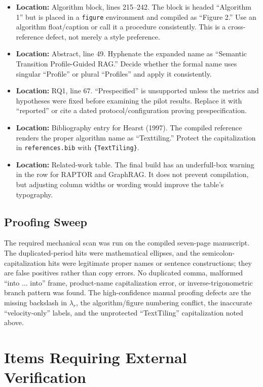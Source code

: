 \documentclass[11pt]{article}
\newcommand{\location}[1]{\textbf{Location:} #1}
\begin{document}
\begin{itemize}
  \item \location{Algorithm block, lines 215--242.} The block is headed ``Algorithm 1'' but is placed in a \texttt{figure} environment and compiled as ``Figure 2.'' Use an algorithm float/caption or call it a procedure consistently. This is a cross-reference defect, not merely a style preference.
  \item \location{Abstract, line 49.} Hyphenate the expanded name as ``Semantic Transition Profile-Guided RAG.'' Decide whether the formal name uses singular ``Profile'' or plural ``Profiles'' and apply it consistently.
  \item \location{RQ1, line 67.} ``Prespecified'' is unsupported unless the metrics and hypotheses were fixed before examining the pilot results. Replace it with ``reported'' or cite a dated protocol/configuration proving prespecification.
  \item \location{Bibliography entry for Hearst (1997).} The compiled reference renders the proper algorithm name as ``Texttiling.'' Protect the capitalization in \texttt{references.bib} with \verb|{TextTiling}|.
  \item \location{Related-work table.} The final build has an underfull-box warning in the row for RAPTOR and GraphRAG. It does not prevent compilation, but adjusting column widths or wording would improve the table's typography.
\end{itemize}

\subsection*{Proofing Sweep}

The required mechanical scan was run on the compiled seven-page manuscript. The duplicated-period hits were mathematical ellipses, and the semicolon-capitalization hits were legitimate proper names or sentence constructions; they are false positives rather than copy errors. No duplicated comma, malformed ``into ... into'' frame, product-name capitalization error, or inverse-trigonometric branch pattern was found. The high-confidence manual proofing defects are the missing backslash in $\lambda_r$, the algorithm/figure numbering conflict, the inaccurate ``velocity-only'' labels, and the unprotected ``TextTiling'' capitalization noted above.

\section*{Items Requiring External Verification}
\end{document}
